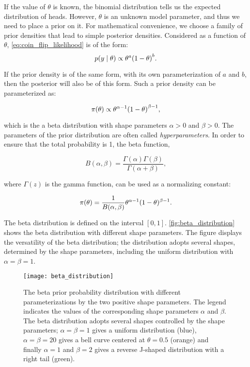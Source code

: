If the value of $\theta$ is known, the binomial distribution tells us the expected distribution of heads. However, $\theta$ is an unknown model parameter, and thus we need to place a prior on it. For mathematical convenience, we choose a family of prior densities that lead to simple posterior densities. Considered as a function of $\theta$, \autoref{eq:coin_flip_likelihood} is of the form: 
\begin{equation*}
    p \qty(y \mid \theta) \propto \theta^a \qty(1 - \theta)^b.
\end{equation*} 

If the prior density is of the same form, with its own parameterization of $a$ and $b$, then the posterior will also be of this form. Such a prior density can be parameterized as: 

\begin{equation*}
    \pi \qty(\theta) \propto \theta^{\alpha - 1} \qty(1 - \theta)^{\beta -1},
\end{equation*}

which is the a beta distribution with shape parameters $\alpha>0$ and $\beta>0$. The parameters of the prior distribution are often called \textit{hyperparameters}. In order to ensure that the total probability is 1, the beta function,

\begin{equation*}
    B (\alpha, \beta) = \frac{\Gamma(\alpha)\Gamma(\beta)}{\Gamma(\alpha + \beta)},
\end{equation*}

where $\Gamma (z)$ is the gamma function, can be used as a normalizing constant:

\begin{equation}\label{eq:beta_prior}
    \pi \qty(\theta) = \frac{1}{B(\alpha, \beta)} \theta^{\alpha -1} (1-\theta)^{\beta -1}.
\end{equation}

The beta distribution is defined on the interval $[0, 1]$. \autoref{fig:beta_distribution} shows the beta distribution with different shape parameters. The figure displays the versatility of the beta distribution; the distribution adopts several shapes, determined by the shape parameters, including the uniform distribution with $\alpha = \beta = 1$. 

\begin{figure}[ht]
    \centering
    \texttt{[image: beta\_distribution]}
    \caption{The beta prior probability distribution with different parameterizations by the two positive shape parameters. The legend indicates the values of the corresponding shape parameters $\alpha$ and $\beta$. The beta distribution adopts several shapes controlled by the shape parameters; $\alpha=\beta=1$ gives a uniform distribution (blue), $\alpha=\beta=20$ gives a bell curve centered at $\theta=0.5$ (orange) and finally $\alpha=1$ and $\beta=2$ gives a reverse J-shaped distribution with a right tail (green).
    }
    \label{fig:beta_distribution}
\end{figure} 


